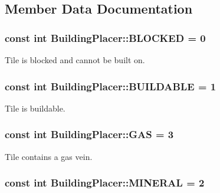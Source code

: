 \subsection{Member Data Documentation}
\hypertarget{class_building_placer_aa5f18306d21fd2bc117614a037054f72}{
\subsubsection[{B\-L\-O\-C\-K\-E\-D}]{\setlength{\rightskip}{0pt plus 5cm}const int Building\-Placer\-::\-B\-L\-O\-C\-K\-E\-D = 0\hspace{0.3cm}{\ttfamily [static]}}}\label{class_building_placer_aa5f18306d21fd2bc117614a037054f72}
Tile is blocked and cannot be built on. \hypertarget{class_building_placer_ae705dbf64028029a95853e41ef1ef0b5}{
\subsubsection[{B\-U\-I\-L\-D\-A\-B\-L\-E}]{\setlength{\rightskip}{0pt plus 5cm}const int Building\-Placer\-::\-B\-U\-I\-L\-D\-A\-B\-L\-E = 1\hspace{0.3cm}{\ttfamily [static]}}}\label{class_building_placer_ae705dbf64028029a95853e41ef1ef0b5}
Tile is buildable. \hypertarget{class_building_placer_a0d76281f0d12ca202e87c0715c986c9b}{
\subsubsection[{G\-A\-S}]{\setlength{\rightskip}{0pt plus 5cm}const int Building\-Placer\-::\-G\-A\-S = 3\hspace{0.3cm}{\ttfamily [static]}}}\label{class_building_placer_a0d76281f0d12ca202e87c0715c986c9b}
Tile contains a gas vein. \hypertarget{class_building_placer_a490d4077d692b82bed675c4604ae6be5}{
\subsubsection[{M\-I\-N\-E\-R\-A\-L}]{\setlength{\rightskip}{0pt plus 5cm}const int Building\-Placer\-::\-M\-I\-N\-E\-R\-A\-L = 2\hspace{0.3cm}{\ttfamily [static]}}}\label{class_building_placer_a490d4077d692b82bed675c4604ae6be5}
